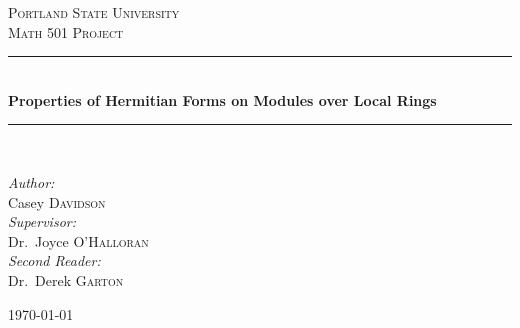 \begin{titlepage}
\begin{center}

\textsc{\LARGE Portland State University}\\[1.5cm]

\textsc{\Large Math 501 Project}\\[0.5cm]

\hrule ~\\[0.4cm]
{ \large \bfseries Properties of Hermitian Forms on Modules over Local Rings \\[0.4cm] }

\hrule ~\\[0.75cm]

\begin{center}
\emph{Author:}\\
Casey \textsc{Davidson}\\[1cm]

\emph{Supervisor:}\\
Dr.~Joyce \textsc{O'Halloran}\\[1cm]

\emph{Second Reader:}\\
Dr.~Derek \textsc{Garton}
\end{center}


\vfill

{\large \today}

\end{center}
\end{titlepage}